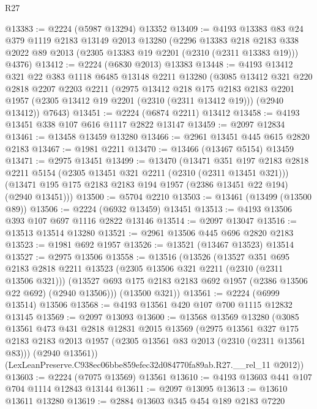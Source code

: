 \begin{lexlean}{R27}
\begin{coremodule}
@13383 := @2224 (@5987 @13294) @13352
@13409 := @4193
    @13383
    @83
    @24
    @379
    @1119
    @2183
    @13149
    @2013
    @13280
    (@2296
      @13383
      @218
      @2183
      @338
      @2022
      @89
      @2013
      (@2305 @13383 @19 @2201 (@2310 (@2311 @13383 @19)))
      @4376)
@13412 := @2224 (@6830 @2013) @13383
@13448 := @4193
    @13412
    @321
    @22
    @383
    @1118
    @6485
    @13148
    @2211
    @13280
    (@3085
      @13412
      @321
      @220
      @2818
      @2207
      @2203
      @2211
      (@2975
        @13412
        @218
        @175
        @2183
        @2183
        @2201
        @1957
        (@2305 @13412 @19 @2201 (@2310 (@2311 @13412 @19)))
        (@2940 @13412))
      @7643)
@13451 := @2224 (@6874 @2211) @13412
@13458 := @4193 @13451 @338 @107 @616 @1117 @2822 @13147
@13459 := @2097 @12834
@13461 := @13458 @13459 @13280
@13466 := @2961 @13451 @445 @615 @2820 @2183
@13467 := @1981 @2211
@13470 := @13466 (@13467 @5154) @13459
@13471 := @2975 @13451
@13499 := @13470
    (@13471
      @351
      @197
      @2183
      @2818
      @2211
      @5154
      (@2305 @13451 @321 @2211 (@2310 (@2311 @13451 @321)))
      (@13471 @195 @175 @2183 @2183 @194 @1957 (@2386 @13451 @22 @194) (@2940 @13451)))
@13500 := @5704 @2210
@13503 := @13461 (@13499 (@13500 @89))
@13506 := @2224 (@6932 @13459) @13451
@13513 := @4193 @13506 @393 @107 @697 @1116 @2822 @13146
@13514 := @2097 @13047
@13516 := @13513 @13514 @13280
@13521 := @2961 @13506 @445 @696 @2820 @2183
@13523 := @1981 @692 @1957
@13526 := @13521 (@13467 @13523) @13514
@13527 := @2975 @13506
@13558 := @13516
    (@13526
      (@13527
        @351
        @695
        @2183
        @2818
        @2211
        @13523
        (@2305 @13506 @321 @2211 (@2310 (@2311 @13506 @321)))
        (@13527 @693 @175 @2183 @2183 @692 @1957 (@2386 @13506 @22 @692) (@2940 @13506)))
      (@13500 @321))
@13561 := @2224 (@6999 @13514) @13506
@13568 := @4193 @13561 @420 @107 @700 @1115 @12832 @13145
@13569 := @2097 @13093
@13600 := @13568
    @13569
    @13280
    (@3085
      @13561
      @473
      @431
      @2818
      @12831
      @2015
      @13569
      (@2975
        @13561
        @327
        @175
        @2183
        @2183
        @2013
        @1957
        (@2305 @13561 @83 @2013 (@2310 (@2311 @13561 @83)))
        (@2940 @13561))
      (LexLeanPreserve.C938ec06bbe859efec32d084770fa89ab.R27.__rel_11 @2012))
@13603 := @2224 (@7075 @13569) @13561
@13610 := @4193 @13603 @441 @107 @704 @1114 @12843 @13144
@13611 := @2097 @13095
@13613 := @13610 @13611 @13280
@13619 := @2884 @13603 @345 @454 @189 @2183 @7220

\end{coremodule}
\end{lexlean}
